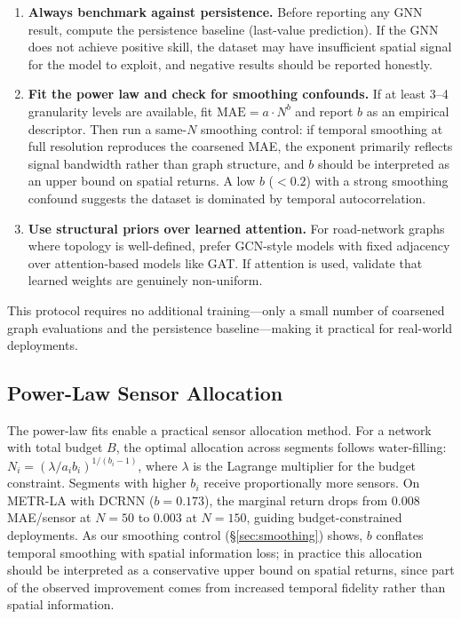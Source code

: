 \documentclass[letterpaper]{article}
\begin{document}
\begin{enumerate}
    \item \textbf{Always benchmark against persistence.} Before reporting any GNN result, compute the persistence baseline (last-value prediction). If the GNN does not achieve positive skill, the dataset may have insufficient spatial signal for the model to exploit, and negative results should be reported honestly.
    \item \textbf{Fit the power law and check for smoothing confounds.} If at least 3--4 granularity levels are available, fit $\text{MAE} = a \cdot N^b$ and report $b$ as an empirical descriptor. Then run a same-$N$ smoothing control: if temporal smoothing at full resolution reproduces the coarsened MAE, the exponent primarily reflects signal bandwidth rather than graph structure, and $b$ should be interpreted as an upper bound on spatial returns. A low $b$ ($< 0.2$) with a strong smoothing confound suggests the dataset is dominated by temporal autocorrelation.
    \item \textbf{Use structural priors over learned attention.} For road-network graphs where topology is well-defined, prefer GCN-style models with fixed adjacency over attention-based models like GAT. If attention is used, validate that learned weights are genuinely non-uniform.
\end{enumerate}

This protocol requires no additional training---only a small number of coarsened graph evaluations and the persistence baseline---making it practical for real-world deployments.

\subsection{Power-Law Sensor Allocation}
\label{sec:allocation}

The power-law fits enable a practical sensor allocation method. For a network with total budget $B$, the optimal allocation across segments follows water-filling: $N_i = (\lambda / a_i b_i)^{1/(b_i - 1)}$, where $\lambda$ is the Lagrange multiplier for the budget constraint. Segments with higher $b_i$ receive proportionally more sensors. On METR-LA with DCRNN ($b = 0.173$), the marginal return drops from $0.008$ MAE/sensor at $N = 50$ to $0.003$ at $N = 150$, guiding budget-constrained deployments. As our smoothing control (\S\ref{sec:smoothing}) shows, $b$ conflates temporal smoothing with spatial information loss; in practice this allocation should be interpreted as a conservative upper bound on spatial returns, since part of the observed improvement comes from increased temporal fidelity rather than spatial information.
\end{document}
